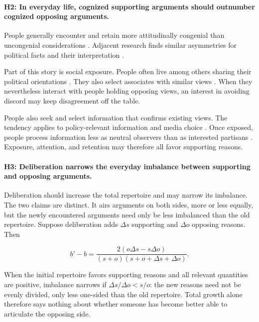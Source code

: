 \documentclass{article}
\begin{document}
\paragraph{H2: In everyday life, cognized supporting arguments should outnumber cognized
opposing arguments.}
People generally encounter and retain more attitudinally congenial than uncongenial
considerations \citep{mutz2002cross,baron1998judgment}. Adjacent research finds similar
asymmetries for political facts and their interpretation
\citep{dellicarpini1991stability,dellicarpini1997what,bartels2002beyond,
shapiro2008facts,jerit2012partisan,
gaines2007same}.

Part of this story is social exposure. People often live among others sharing their political
orientations \citep{bishop2009big,abrams2012big,cho2013voter,mcdonald2011migration}. They also select associates with similar
views \citep{verbrugge1977structure,verbrugge1983research,huckfeldt1995citizens,
mutz2001facilitating,mackuen1990speaking,bennett2000political}. When they nevertheless interact with people holding
opposing views, an interest in avoiding discord may keep disagreement off the table.

People also seek and select information that confirms existing views. The tendency applies to
policy-relevant information and media choice \citep{iyengar2008selective,
garrett2009politically,iyengar2009red,
stroud2008media,sunstein2001republic}. Once exposed, people process information less as neutral
observers than as interested partisans \citep{chang2003party,lord1979biased}. Exposure,
attention, and retention may therefore all favor supporting reasons.

\paragraph{H3: Deliberation narrows the everyday imbalance between supporting and opposing
arguments.}
Deliberation should increase the total repertoire and may narrow its imbalance. The two claims
are distinct. It airs arguments on both sides, more or less equally, but the newly encountered
arguments need only be less imbalanced than the old repertoire. Suppose deliberation adds
$\Delta s$ supporting and $\Delta o$ opposing reasons. Then

\begin{equation}
b'-b=
\frac{2(o\Delta s-s\Delta o)}
{(s+o)(s+o+\Delta s+\Delta o)}.
\end{equation}

When the initial repertoire favors supporting reasons and all relevant quantities are positive,
imbalance narrows if $\Delta s/\Delta o<s/o$: the new reasons need not be evenly divided, only
less one-sided than the old repertoire. Total growth alone therefore says nothing about whether
someone has become better able to articulate the opposing side.
\end{document}
